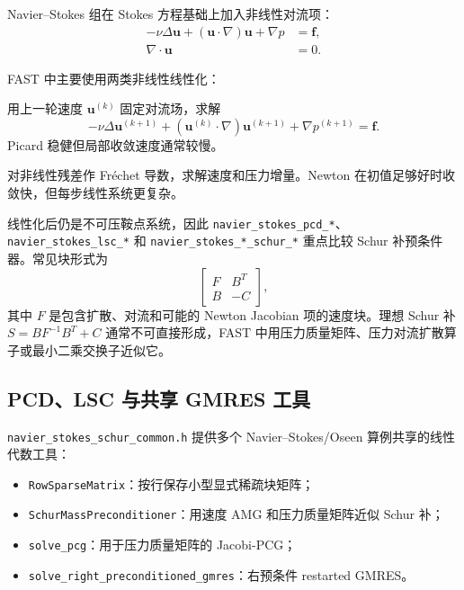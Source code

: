 \documentclass[UTF8,openany,zihao=-4,scheme=chinese]{ctexbook}
\newcommand{\file}[1]{\nolinkurl{#1}}
\newcommand{\class}[1]{\texttt{#1}}
\begin{document}
Navier--Stokes 组在 Stokes 方程基础上加入非线性对流项：
\[
\begin{aligned}
  -\nu\Delta\boldsymbol u
  +(\boldsymbol u\cdot\nabla)\boldsymbol u
  +\nabla p &= \boldsymbol f,\\
  \nabla\cdot\boldsymbol u &= 0.
\end{aligned}
\]

FAST 中主要使用两类非线性线性化：

\begin{description}[leftmargin=2em,style=nextline]
  \item[Picard 迭代]
    用上一轮速度 $\boldsymbol u^{(k)}$ 固定对流场，求解
    \[
      -\nu\Delta\boldsymbol u^{(k+1)}
      +(\boldsymbol u^{(k)}\cdot\nabla)\boldsymbol u^{(k+1)}
      +\nabla p^{(k+1)}=\boldsymbol f.
    \]
    Picard 稳健但局部收敛速度通常较慢。
  \item[Newton 迭代]
    对非线性残差作 Fréchet 导数，求解速度和压力增量。Newton 在初值足够好时收敛快，但每步线性系统更复杂。
\end{description}

线性化后仍是不可压鞍点系统，因此 \file{navier\_stokes\_pcd\_*}、\file{navier\_stokes\_lsc\_*} 和 \file{navier\_stokes\_*\_schur\_*} 重点比较 Schur 补预条件器。常见块形式为
\[
  \begin{bmatrix}
    F & B^T\\
    B & -C
  \end{bmatrix},
\]
其中 $F$ 是包含扩散、对流和可能的 Newton Jacobian 项的速度块。理想 Schur 补 $S=BF^{-1}B^T+C$ 通常不可直接形成，FAST 中用压力质量矩阵、压力对流扩散算子或最小二乘交换子近似它。

\subsection{PCD、LSC 与共享 GMRES 工具}

\file{navier\_stokes\_schur\_common.h} 提供多个 Navier--Stokes/Oseen 算例共享的线性代数工具：

\begin{itemize}[leftmargin=2em]
  \item \class{RowSparseMatrix}：按行保存小型显式稀疏块矩阵；
  \item \class{SchurMassPreconditioner}：用速度 AMG 和压力质量矩阵近似 Schur 补；
  \item \class{solve\_pcg}：用于压力质量矩阵的 Jacobi-PCG；
  \item \class{solve\_right\_preconditioned\_gmres}：右预条件 restarted GMRES。
\end{itemize}
\end{document}
